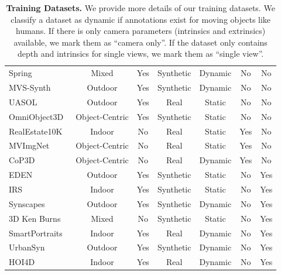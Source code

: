 \begin{table}[ht]
{\begin{tabular}{l c c c c c c}
Spring~\cite{mehl2023spring} & Mixed & Yes & Synthetic & Dynamic & No & No \\
MVS-Synth~\cite{DeepMVS} & Outdoor & Yes & Synthetic & Dynamic & No & No \\
UASOL~\cite{bauer2019uasol} & Outdoor & Yes & Real & Static & No & No \\
OmniObject3D~\cite{wu2023omniobject3d} & Object-Centric & Yes & Synthetic & Static & No & No \\
RealEstate10K~\cite{realestate10k} & Indoor & No & Real & Static & Yes & No \\
MVImgNet~\cite{yu2023mvimgnet} & Object-Centric & No & Real & Static & Yes & No \\
CoP3D~\cite{sinha2023cop3d} & Object-Centric & No & Real & Dynamic & Yes & No \\
EDEN~\cite{le2021eden} & Outdoor & Yes & Synthetic & Static & No & Yes \\
IRS~\cite{wang2021irs} & Indoor & Yes & Synthetic & Static & No & Yes \\
Synscapes~\cite{wrenninge2018synscapes} & Outdoor & Yes & Synthetic & Dynamic & No & Yes \\
3D Ken Burns~\cite{3dkb} & Mixed & No & Synthetic & Static & No & Yes \\
SmartPortraits~\cite{kornilova2022smartportraits} & Indoor & Yes & Real & Dynamic & No & Yes \\
UrbanSyn~\cite{gómez2023urbansyn} & Outdoor & Yes & Synthetic & Dynamic & No & Yes \\
HOI4D~\cite{liu2022hoi4d} & Indoor & Yes & Real & Dynamic & No & Yes \\
\bottomrule
\end{tabular}%
}
\caption{\textbf{Training Datasets.} We provide more details of our training datasets. We classify a dataset as dynamic if annotations exist for moving objects like humans. If there is only camera parameters (intrinsics and extrinsics) available, we mark them as ``camera only''. If the dataset only contains depth and intrinsics for single views, we mark them as ``single view''.}
\label{tab:dataset_info}
\end{table}


